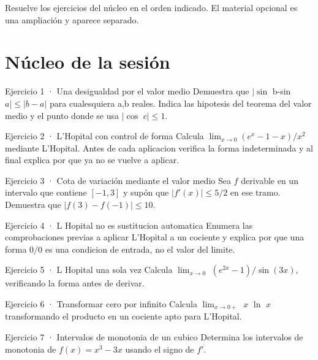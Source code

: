 \documentclass[10pt,a4paper,oneside,openany]{book}
\begin{document}
Resuelve los ejercicios del núcleo en el orden indicado. El material opcional es una ampliación y aparece separado.
\section*{Núcleo de la sesión}
\begin{PSevenExerciseFixed}{Ejercicio 1 · Una desigualdad por el valor medio}
Demuestra que \(|\sin\) b-sin \(a|\le |b-a|\) para cualesquiera a,b reales. Indica las hipotesis del teorema del valor medio y el punto donde se usa \(|\cos\) \(c|\le 1\).
\end{PSevenExerciseFixed}
\begin{PSevenExerciseFixed}{Ejercicio 2 · L'Hopital con control de forma}
Calcula \(\lim_{x\to 0}(e^x-1-x)/x^{2}\) mediante L'Hopital. Antes de cada aplicacion verifica la forma indeterminada y al final explica por que ya no se vuelve a aplicar.
\end{PSevenExerciseFixed}
\begin{PSevenExerciseFixed}{Ejercicio 3 · Cota de variación mediante el valor medio}
Sea \(f\) derivable en un intervalo que contiene \([-1,3]\) y supón que \(|f'(x)|\le5/2\) en ese tramo. Demuestra que \(|f(3)-f(-1)|\le10\).
\end{PSevenExerciseFixed}
\begin{PSevenExerciseFixed}{Ejercicio 4 · L Hopital no es sustitucion automatica}
Enumera las comprobaciones previas a aplicar L'Hopital a un cociente y explica por que una forma \(0/0\) es una condicion de entrada, no el valor del limite.
\end{PSevenExerciseFixed}
\begin{PSevenExerciseFixed}{Ejercicio 5 · L Hopital una sola vez}
Calcula \(\lim_{x\to 0}\) \((e^{2x}-1)/\sin(3x),\) verificando la forma antes de derivar.
\end{PSevenExerciseFixed}
\begin{PSevenExerciseFixed}{Ejercicio 6 · Transformar cero por infinito}
Calcula \(\lim_{x\to 0+}\) \(x\) \(\ln\) \(x\) transformando el producto en un cociente apto para L'Hopital.
\end{PSevenExerciseFixed}
\begin{PSevenExerciseFixed}{Ejercicio 7 · Intervalos de monotonia de un cubico}
Determina los intervalos de monotonia de \(f(x)=x^{3}-3x\) usando el signo de \(f'\).
\end{PSevenExerciseFixed}
\end{document}
